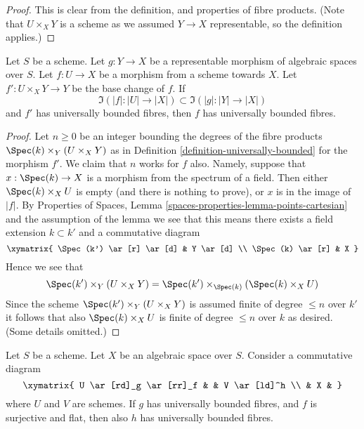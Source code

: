 \begin{proof}
This is clear from the definition, and properties of fibre products.
(Note that $U \times_X Y$ is a scheme
as we assumed $Y \to X$ representable, so the definition applies.)
\end{proof}

\begin{lemma}
\label{lemma-descent-universally-bounded}
Let $S$ be a scheme. Let $g : Y \to X$ be a representable morphism of
algebraic spaces over $S$. Let $f : U \to X$ be a morphism from a scheme
towards $X$. Let $f' : U \times_X Y \to Y$ be the base change of $f$.
If
$$
\Im(|f| : |U| \to |X|) \subset \Im(|g| : |Y| \to |X|)
$$
and $f'$ has universally bounded fibres, then $f$ has universally
bounded fibres.
\end{lemma}

\begin{proof}
Let $n \geq 0$ be an integer bounding the degrees of the fibre
products $\Spec(k) \times_Y (U \times_X Y)$ as in
Definition \ref{definition-universally-bounded} for the morphism $f'$.
We claim that $n$ works for $f$ also. Namely, suppose that
$x : \Spec(k) \to X$ is a morphism from the spectrum of
a field. Then either $\Spec(k) \times_X U$ is empty (and there
is nothing to prove), or $x$ is in the image of $|f|$. By
Properties of Spaces,
Lemma \ref{spaces-properties-lemma-points-cartesian}
and the assumption of the lemma we see
that this means there exists a field extension $k \subset k'$ and a
commutative diagram
$$
\xymatrix{
\Spec(k') \ar[r] \ar[d] & Y \ar[d] \\
\Spec(k) \ar[r] & X
}
$$
Hence we see that
$$
\Spec(k') \times_Y (U \times_X Y) =
\Spec(k') \times_{\Spec(k)} (\Spec(k) \times_X U)
$$
Since the scheme $\Spec(k') \times_Y (U \times_X Y)$ is assumed finite
of degree $\leq n$ over $k'$ it follows that also $\Spec(k) \times_X U$
is finite of degree $\leq n$ over $k$ as desired. (Some details omitted.)
\end{proof}

\begin{lemma}
\label{lemma-universally-bounded-permanence}
Let $S$ be a scheme. Let $X$ be an algebraic space over $S$.
Consider a commutative diagram
$$
\xymatrix{
U \ar[rd]_g \ar[rr]_f & & V \ar[ld]^h \\
& X &
}
$$
where $U$ and $V$ are schemes. If $g$ has universally bounded fibres,
and $f$ is surjective and flat, then also $h$ has universally bounded fibres.
\end{lemma}

